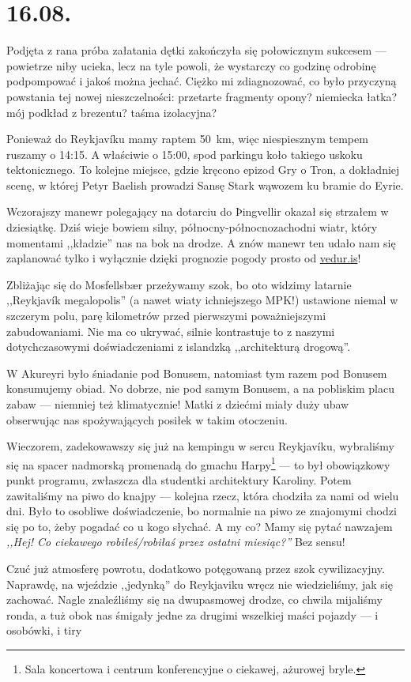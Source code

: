 \chapter*{16.08.}

Podjęta z rana próba załatania dętki zakończyła się połowicznym sukcesem --- powietrze niby ucieka, lecz na tyle powoli, że wystarczy co godzinę odrobinę podpompować i jakoś można jechać. Ciężko mi zdiagnozować, co było przyczyną powstania tej nowej nieszczelności: przetarte fragmenty opony? niemiecka łatka? mój podkład z brezentu? taśma izolacyjna?

Ponieważ do Reykjavíku mamy raptem 50~km, więc niespiesznym tempem ruszamy o 14:15. A właściwie o 15:00, spod parkingu koło takiego uskoku tektonicznego. To kolejne miejsce, gdzie kręcono epizod Gry o Tron, a dokładniej scenę, w której Petyr Baelish prowadzi Sansę Stark wąwozem ku bramie do Eyrie.

Wczorajszy manewr polegający na dotarciu do Þingvellir okazał się strzałem w dziesiątkę. Dziś wieje bowiem silny, północny-północnozachodni wiatr, który momentami ,,kładzie'' nas na bok na drodze. A znów manewr ten udało nam się zaplanować tylko i wyłącznie dzięki prognozie pogody prosto od \url{vedur.is}!

Zbliżając się do Mosfellsbær przeżywamy szok, bo oto widzimy latarnie ,,Reykjavík megalopolis'' (a nawet wiaty ichniejszego MPK!) ustawione niemal w szczerym polu, parę kilometrów przed pierwszymi poważniejszymi zabudowaniami. Nie ma co ukrywać, silnie kontrastuje to z naszymi dotychczasowymi doświadczeniami z islandzką ,,architekturą drogową''.


W Akureyri było śniadanie pod Bonusem, natomiast tym razem pod Bonusem konsumujemy obiad. No dobrze, nie pod samym Bonusem, a na pobliskim placu zabaw --- niemniej też klimatycznie! Matki z dziećmi miały duży ubaw obserwując nas spożywających posiłek w takim otoczeniu.

Wieczorem, zadekowawszy się już na kempingu w sercu Reykjavíku, wybraliśmy się na spacer nadmorską promenadą do gmachu Harpy\footnote{Sala koncertowa i centrum konferencyjne o ciekawej, ażurowej bryle.} --- to był obowiązkowy punkt programu, zwłaszcza dla studentki architektury Karoliny. Potem zawitaliśmy na piwo do knajpy --- kolejna rzecz, która chodziła za nami od wielu dni. Było to osobliwe doświadczenie, bo normalnie na piwo ze znajomymi chodzi się po to, żeby pogadać co u kogo słychać. A my co? Mamy się pytać nawzajem \emph{,,Hej! Co ciekawego robiłeś/robiłaś przez ostatni miesiąc?''} Bez sensu!

Czuć już atmosferę powrotu, dodatkowo potęgowaną przez szok cywilizacyjny. Naprawdę, na wjeździe ,,jedynką'' do Reykjaviku wręcz nie wiedzieliśmy, jak się zachować. Nagle znaleźliśmy się na dwupasmowej drodze, co chwila mijaliśmy ronda, a tuż obok nas śmigały jedne za drugimi wszelkiej maści pojazdy --- i osobówki, i tiry\textellipsis

